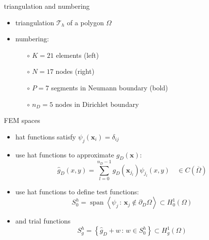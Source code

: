 \documentclass[hide notes,intlimits,usenames,dvipsnames]{beamer}
\newcommand{\bx}{\mathbf{x}}
\newcommand{\Span}{\operatorname{span}}
\begin{document}
\begin{frame}{triangulation and numbering}
\mbox{ \quad }

\begin{itemize}
\item triangulation $\mathcal{T}_h$ of a polygon $\Omega$
\item numbering:
    \begin{itemize}
    \item[$\circ$] $K=21$ elements (left)
    \item[$\circ$] $N=17$ nodes (right)
    \item[$\circ$] $P=7$ segments in Neumann boundary (bold)
    \item[$\circ$] $n_D=5$ nodes in Dirichlet boundary
    \end{itemize}
\end{itemize}
\end{frame}

\begin{frame}{FEM spaces}
\vspace{4mm}

\begin{itemize}
\item hat functions satisfy $\psi_j(\bx_i)=\delta_{ij}$

\vspace{-10mm}

\hfill 
\item use hat functions to approximate $g_D(\bx)$:
\begin{equation*}
\hat g_D(x,y) = \sum_{l=0}^{n_D-1} g_D(\bx_{j_l}) \psi_{j_l}(x,y) \quad \in C(\overline\Omega)
\end{equation*}
\item use hat functions to define test functions:
\begin{equation*}
S_{0}^h = \Span\left<\psi_j \,:\, \bx_j \notin \partial_D \Omega\right> \subset H_0^1(\Omega)
\end{equation*}
\item and trial functions
\begin{equation*}
S_{g}^h = \left\{\hat g_D + w \,:\, w \in S_{0}^h\right\} \subset H_g^1(\Omega)
\end{equation*}
\end{itemize}
\end{frame}
\end{document}
